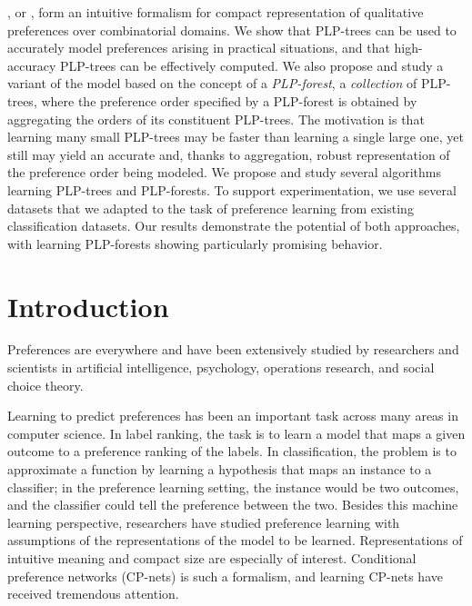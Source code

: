 , or , form
an intuitive formalism for compact representation of qualitative 
preferences over combinatorial domains. We show that PLP-trees can be 
used to accurately model preferences arising in practical situations, and 
that high-accuracy PLP-trees can be effectively computed. We also propose 
and study a variant of the model based on the concept of a \emph{PLP-forest},
a \emph{collection} of PLP-trees, where the preference order specified by a 
PLP-forest is obtained by aggregating the orders of its constituent PLP-trees. 
The motivation is that learning many small PLP-trees may be faster than 
learning a single large one, yet still may yield an accurate and, thanks to 
aggregation, robust representation of the preference order being modeled.
We propose and study several algorithms learning PLP-trees and PLP-forests.
To support experimentation, 
we use several datasets that we adapted to the task of preference learning 
from existing classification datasets.
Our results demonstrate the potential of both approaches, with learning 
PLP-forests showing particularly promising behavior.

\section{Introduction}
Preferences are everywhere and have been extensively studied
by researchers and scientists in artificial intelligence,
psychology, operations research, and social choice theory.


Learning to predict preferences has been an important task across many
areas in computer science.
In label ranking, the task is to learn a model that
maps a given outcome to a preference ranking of the labels.
In classification, the problem is to approximate
a function by learning a hypothesis that maps an instance
to a classifier; in the preference learning setting,
the instance would be two outcomes, and the classifier could
tell the preference between the two.
Besides this machine learning perspective,
researchers have studied preference learning with
assumptions of the representations of the model to
be learned.
Representations of intuitive meaning and compact size
are especially of interest.
Conditional preference networks (CP-nets)\cite{boutilier2004cp}
is such a formalism, and learning CP-nets have 
received tremendous attention.


